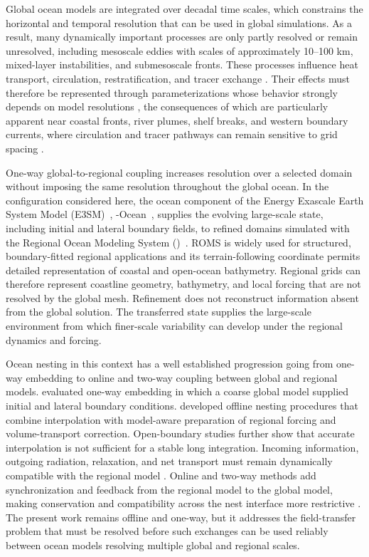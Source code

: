 Global ocean models are integrated over decadal time scales, which constrains the horizontal and temporal resolution that can be used in global simulations. As a result, many dynamically important processes are only partly resolved or remain unresolved, including mesoscale eddies with scales of approximately 10--100 km, mixed-layer instabilities, and submesoscale fronts. These processes influence heat transport, circulation, restratification, and tracer exchange \citep{boccaletti2007mixed,foxkemper2008mle,thomas2008submesoscale,taylor2023submesoscale}. Their effects must therefore be represented through parameterizations whose behavior strongly depends on model resolutions \citep{hallberg2013using}, the consequences of which are particularly apparent near coastal fronts, river plumes, shelf breaks, and western boundary currents, where circulation and tracer pathways can remain sensitive to grid spacing \citep{chassignet2017impact}.

One-way global-to-regional coupling increases resolution over a selected domain without imposing the same resolution throughout the global ocean. In the configuration considered here, the ocean component of the Energy Exascale Earth System Model (E3SM)~\citep{golaz2019e3sm}, \MPAS-Ocean~\citep{ringler2013multi,hoch2020MPAS}, supplies the evolving large-scale state, including initial and lateral boundary fields, to refined domains simulated with the Regional Ocean Modeling System (\ROMS)~\citep{shchepetkin2005regional}. ROMS is widely used for structured, boundary-fitted regional applications and its terrain-following coordinate permits detailed representation of coastal and open-ocean bathymetry. Regional grids can therefore represent coastline geometry, bathymetry, and local forcing that are not resolved by the global \MPAS mesh. Refinement does not reconstruct information absent from the global solution. The transferred state supplies the large-scale environment from which finer-scale variability can develop under the regional dynamics and forcing.

Ocean nesting in this context has a well established progression going from one-way embedding to online and two-way coupling between global and regional models. \citet{penven2006embedding} evaluated one-way \ROMS embedding in which a coarse global model supplied initial and lateral boundary conditions. \citet{mason2010nesting} developed offline nesting procedures that combine interpolation with model-aware preparation of regional forcing and volume-transport correction. Open-boundary studies further show that accurate interpolation is not sufficient for a stable long integration. Incoming information, outgoing radiation, relaxation, and net transport must remain dynamically compatible with the regional model \citep{marchesiello2001open,blayo2005boundary,oddo2008boundary}. Online and two-way methods add synchronization and feedback from the regional model to the global model, making conservation and compatibility across the nest interface more restrictive \citep{debreu2008embedding,debreu2012nesting}. The present work remains offline and one-way, but it addresses the field-transfer problem that must be resolved before such exchanges can be used reliably between ocean models resolving multiple global and regional scales.

